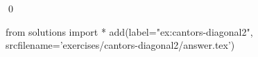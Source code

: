 
\begin{ex} 
  \label{ex:cantors-diagonal2}
  
  \qed
\end{ex} 
\begin{python0}
from solutions import *
add(label="ex:cantors-diagonal2",
    srcfilename='exercises/cantors-diagonal2/answer.tex') 
\end{python0}
